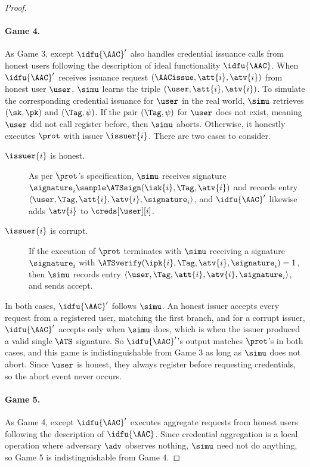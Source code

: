 \begin{proof}
  \paragraph{Game 4.} As Game 3, except $\idfu{\AAC}'$ also handles credential
issuance calls from honest users following the description of ideal
functionality $\idfu{\AAC}$.  When  $\idfu{\AAC}'$ receives issuance request
$(\AACissue, \att{i}, \atv{i})$ from honest user $\user$, $\simu$ learns the
triple $(\user, \att{i}, \atv{i})$.  To simulate the corresponding credential
issuance for $\user$ in the real world, $\simu$ retrieves $(\sk, \pk)$ and
$(\Tag, \psi)$.  If the pair $(\Tag, \psi)$ for $\user$ does not exist, meaning
$\user$ did not call register before, then $\simu$ aborts. Otherwise, it
honestly executes $\prot$ with issuer $\issuer{i}$.  There are two cases to
consider.

  \begin{description}

    \item[$\issuer{i}$ is honest.] As per $\prot$'s specification, $\simu$ receives
signature $\signature_i \sample \ATSsign(\isk{i}, \Tag, \atv{i})$ and
records entry $\langle \user, \Tag, \att{i}, \atv{i}, \signature_i \rangle$, and
$\idfu{\AAC}'$ likewise adds $\atv{i}$ to $\creds[\user][i]$.

    \item[$\issuer{i}$ is corrupt.] If the execution of $\prot$ terminates with
$\simu$ receiving a signature $\signature_i$ with $\ATSverify(\ipk{i}, \Tag,
\atv{i}, \signature_i) = 1$, then $\simu$ records entry $\langle \user, \Tag,
\att{i}, \atv{i}, \signature_i \rangle$, and sends accept.

  \end{description}

  In both cases, $\idfu{\AAC}'$ follows $\simu$. An honest issuer accepts every
request from a registered user, matching the first branch, and for a corrupt
issuer, $\idfu{\AAC}'$ accepts only when $\simu$ does, which is when the issuer
produced a valid single $\ATS$ signature.  So $\idfu{\AAC}'$'s output matches
$\prot$'s in both cases, and this game is indistinguishable from Game 3 as long as
$\simu$ does not abort.  Since $\user$ is honest, they always register
before requesting credentials, so the abort event never occurs.

  \paragraph{Game 5.} As Game 4, except $\idfu{\AAC}'$ executes aggregate
requests from honest users following the description of $\idfu{\AAC}$. Since
credential aggregation is a local operation where adversary $\adv$ observes
nothing, $\simu$ need not do anything, so Game 5 is indistinguishable from Game
4.


\end{proof}
